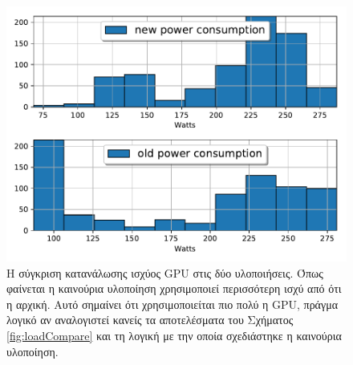 \begin{figure}
    \centering
    \includegraphics[width=\textwidth]{figures/experiments/power_compare.pdf}
    \caption[Σύγκριση κατανάλωσης ισχύος GPU στις δύο υλοποιήσεις]{Η σύγκριση κατανάλωσης ισχύος GPU στις δύο υλοποιήσεις. Όπως φαίνεται η καινούρια υλοποίηση χρησιμοποιεί περισσότερη ισχύ από ότι η αρχική. Αυτό σημαίνει ότι χρησιμοποιείται πιο πολύ η GPU, πράγμα λογικό αν αναλογιστεί κανείς τα αποτελέσματα του Σχήματος \ref{fig:loadCompare} και τη λογική με την οποία σχεδιάστηκε η καινούρια υλοποίηση.}
    \label{fig:powerCompare}
\end{figure}


